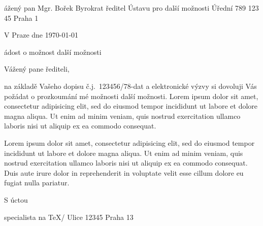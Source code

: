 

\fontfam[bonum]
\cslang

\address
  Vážený pan
  Mgr. Bořek Byrokrat
  ředitel Ústavu pro další možnosti
  Úřední 789
  123 45 Praha 1

\hfill V Praze dne \today



\subject Žádost o možnost další možnosti

Vážený pane řediteli,

na základě Vašeho dopisu č.j.~123456/78-dat a elektronické výzvy si dovoluji 
Vás požádat o prozkoumání mé možnosti další možnosti. 
Lorem ipsum dolor sit amet, consectetur adipisicing elit, sed do
eiusmod tempor incididunt ut labore et dolore magna aliqua. Ut enim ad minim
veniam, quis nostrud exercitation ullamco laboris nisi ut aliquip ex ea
commodo consequat. 

Lorem ipsum dolor sit amet, consectetur adipisicing elit, sed do
eiusmod tempor incididunt ut labore et dolore magna aliqua. Ut enim ad minim
veniam, quis nostrud exercitation ullamco laboris nisi ut aliquip ex ea
commodo consequat. Duis aute irure dolor in reprehenderit in voluptate velit
esse cillum dolore eu fugiat nulla pariatur. 

S úctou

\hfill \address
  {\it Petr Olšák}
  specialista na \TeX/
  Ulice 12345
  Praha 13

\bye